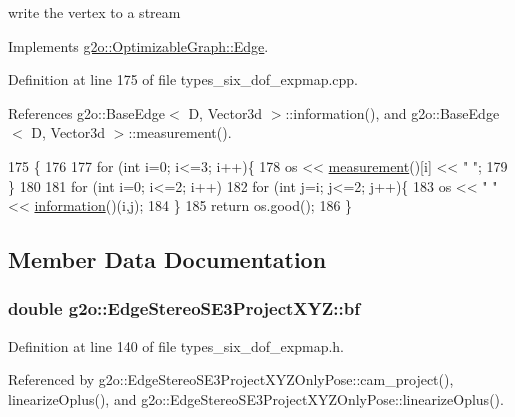 write the vertex to a stream 



Implements \hyperlink{classg2o_1_1OptimizableGraph_1_1Edge_a804b9a2178249b9297c55b8fbbeda56e}{g2o\+::\+Optimizable\+Graph\+::\+Edge}.



Definition at line 175 of file types\+\_\+six\+\_\+dof\+\_\+expmap.\+cpp.



References g2o\+::\+Base\+Edge$<$ D, Vector3d $>$\+::information(), and g2o\+::\+Base\+Edge$<$ D, Vector3d $>$\+::measurement().


\begin{DoxyCode}
175                                                         \{
176 
177   \textcolor{keywordflow}{for} (\textcolor{keywordtype}{int} i=0; i<=3; i++)\{
178     os << \hyperlink{classg2o_1_1BaseEdge_a8c20e7ffa66bb7a4a02c8cee82e89c8b}{measurement}()[i] << \textcolor{stringliteral}{" "};
179   \}
180 
181   \textcolor{keywordflow}{for} (\textcolor{keywordtype}{int} i=0; i<=2; i++)
182     \textcolor{keywordflow}{for} (\textcolor{keywordtype}{int} j=i; j<=2; j++)\{
183       os << \textcolor{stringliteral}{" "} <<  \hyperlink{classg2o_1_1BaseEdge_ab682086df7223ce2b039d652416ddc23}{information}()(i,j);
184     \}
185   \textcolor{keywordflow}{return} os.good();
186 \}
\end{DoxyCode}


\subsection{Member Data Documentation}
\subsubsection[{\texorpdfstring{bf}{bf}}]{\setlength{\rightskip}{0pt plus 5cm}double g2o\+::\+Edge\+Stereo\+S\+E3\+Project\+X\+Y\+Z\+::bf}\hypertarget{classg2o_1_1EdgeStereoSE3ProjectXYZ_afc94291834aa40d18205e61ac802cbfc}{}\label{classg2o_1_1EdgeStereoSE3ProjectXYZ_afc94291834aa40d18205e61ac802cbfc}


Definition at line 140 of file types\+\_\+six\+\_\+dof\+\_\+expmap.\+h.



Referenced by g2o\+::\+Edge\+Stereo\+S\+E3\+Project\+X\+Y\+Z\+Only\+Pose\+::cam\+\_\+project(), linearize\+Oplus(), and g2o\+::\+Edge\+Stereo\+S\+E3\+Project\+X\+Y\+Z\+Only\+Pose\+::linearize\+Oplus().

